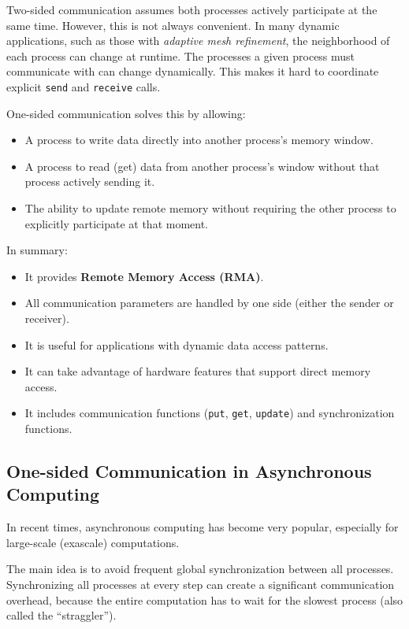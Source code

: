 \documentclass[12pt]{book}
\begin{document}
Two-sided communication assumes both processes actively participate at the same time. However, this is not always convenient. In many dynamic applications, such as those with \emph{adaptive mesh refinement}, the neighborhood of each process can change at runtime. The processes a given process must communicate with can change dynamically. This makes it hard to coordinate explicit \texttt{send} and \texttt{receive} calls.

One-sided communication solves this by allowing:
\begin{itemize}
    \item A process to write data directly into another process's memory window.
    \item A process to read (get) data from another process's window without that process actively sending it.
    \item The ability to update remote memory without requiring the other process to explicitly participate at that moment.
\end{itemize}

In summary:
\begin{itemize}
    \item It provides \textbf{Remote Memory Access (RMA)}.
    \item All communication parameters are handled by one side (either the sender or receiver).
    \item It is useful for applications with dynamic data access patterns.
    \item It can take advantage of hardware features that support direct memory access.
    \item It includes communication functions (\texttt{put}, \texttt{get}, \texttt{update}) and synchronization functions.
\end{itemize}

\subsection*{One-sided Communication in Asynchronous Computing}
In recent times, asynchronous computing has become very popular, especially for large-scale (exascale) computations. 

The main idea is to avoid frequent global synchronization between all processes. Synchronizing all processes at every step can create a significant communication overhead, because the entire computation has to wait for the slowest process (also called the ``straggler''). 
\end{document}
